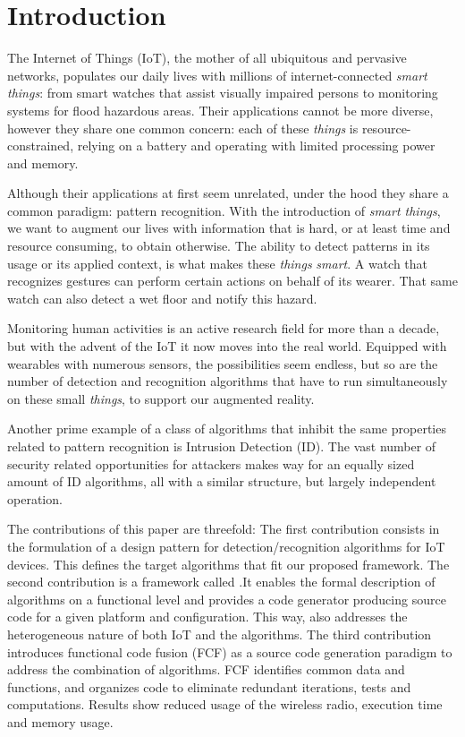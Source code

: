 \documentclass[3p,times,procedia]{elsarticle}
\begin{document}
\vspace*{-10pt}

\section{Introduction}

The Internet of Things (IoT), the mother of all ubiquitous and pervasive
networks, populates our daily lives with millions of internet-connected
\emph{smart things}: from smart watches that assist visually impaired
persons\cite{porzi2013smart} to monitoring systems for flood hazardous
areas\cite{hughes2006gridstix}. Their applications cannot be more diverse,
however they share one common concern: each of these \emph{things} is
resource-constrained, relying on a battery and operating with limited
processing power and memory.

Although their applications at first seem unrelated, under the hood they share
a common paradigm: pattern recognition. With the introduction of \emph{smart
things}, we want to augment our lives with information that is hard, or at
least time and resource consuming, to obtain otherwise. The ability to detect
patterns in its usage or its applied context, is what makes these \emph{things}
\emph{smart}. A watch that recognizes gestures can perform certain actions on
behalf of its wearer. That same watch can also detect a wet floor and notify
this hazard.

Monitoring human activities is an active research field for more than a
decade\cite{lara2013survey}, but with the advent of the IoT it now moves into
the real world. Equipped with wearables with numerous sensors, the
possibilities seem endless, but so are the number of detection and recognition
algorithms that have to run simultaneously on these small \emph{things}, to
support our augmented reality.

Another prime example of a class of algorithms that inhibit the same properties
related to pattern recognition is Intrusion Detection (ID). The vast number of
security related opportunities for attackers makes way for an equally sized
amount of ID algorithms, all with a similar structure, but largely independent
operation.


The contributions of this paper are threefold: The first contribution consists
in the formulation of a design pattern for detection/recognition algorithms for
IoT devices. This defines the target algorithms that fit our proposed
framework. The second contribution is a framework called \FOO.\@ It enables the
formal description of algorithms on a functional level and provides a code
generator producing source code for a given platform and configuration. This
way, \FOO also addresses the heterogeneous nature of both IoT and the
algorithms. The third contribution introduces functional code fusion (FCF) as a
source code generation paradigm to address the combination of algorithms. FCF
identifies common data and functions, and organizes code to eliminate redundant
iterations, tests and computations. Results show reduced usage of the wireless
radio, execution time and memory usage.
\end{document}
